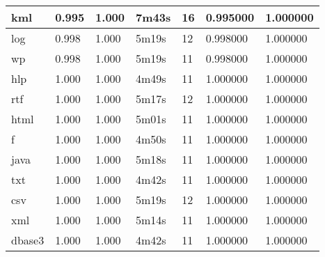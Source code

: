 \begin{table}[!ht]
\begin{tabular}{|l|l|l|l|l|l|l|}
kml      & 0.995           & 1.000          & 7m43s  & 16     & 0.995000  & 1.000000         \\ \hline
log      & 0.998           & 1.000          & 5m19s  & 12     & 0.998000  & 1.000000         \\ \hline
wp       & 0.998           & 1.000          & 5m19s  & 11     & 0.998000  & 1.000000         \\ \hline
hlp      & 1.000           & 1.000          & 4m49s  & 11     & 1.000000  & 1.000000         \\ \hline
rtf      & 1.000           & 1.000          & 5m17s  & 12     & 1.000000  & 1.000000         \\ \hline
html     & 1.000           & 1.000          & 5m01s  & 11     & 1.000000  & 1.000000         \\ \hline
f        & 1.000           & 1.000          & 4m50s  & 11     & 1.000000  & 1.000000         \\ \hline
java     & 1.000           & 1.000          & 5m18s  & 11     & 1.000000  & 1.000000         \\ \hline
txt      & 1.000           & 1.000          & 4m42s  & 11     & 1.000000  & 1.000000         \\ \hline
csv      & 1.000           & 1.000          & 5m19s  & 12     & 1.000000  & 1.000000         \\ \hline
xml      & 1.000           & 1.000          & 5m14s  & 11     & 1.000000  & 1.000000         \\ \hline
dbase3   & 1.000           & 1.000          & 4m42s  & 11     & 1.000000  & 1.000000         \\ \hline
\end{tabular}
\end{table}
